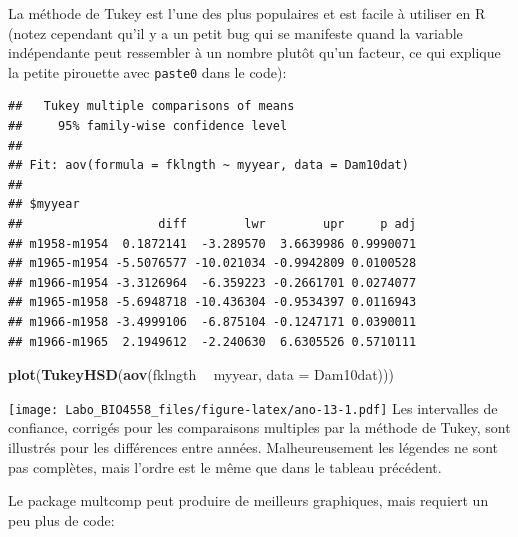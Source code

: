 \documentclass[12pt,]{book}
\newenvironment{Shaded}{\begin{snugshade}}{\end{snugshade}}
\newcommand{\DataTypeTok}[1]{\textcolor[rgb]{0.13,0.29,0.53}{#1}}
\newcommand{\KeywordTok}[1]{\textcolor[rgb]{0.13,0.29,0.53}{\textbf{#1}}}
\newcommand{\NormalTok}[1]{#1}
\newcommand{\OperatorTok}[1]{\textcolor[rgb]{0.81,0.36,0.00}{\textbf{#1}}}
\newcommand{\StringTok}[1]{\textcolor[rgb]{0.31,0.60,0.02}{#1}}
\begin{document}
La méthode de Tukey est l'une des plus populaires et est facile à utiliser en R (notez cependant qu'il y a un petit bug qui se manifeste quand la variable indépendante peut ressembler à un nombre plutôt qu'un facteur, ce qui explique la petite pirouette avec \texttt{paste0} dans le code):

\begin{Shaded}
\end{Shaded}

\begin{verbatim}
##   Tukey multiple comparisons of means
##     95% family-wise confidence level
## 
## Fit: aov(formula = fklngth ~ myyear, data = Dam10dat)
## 
## $myyear
##                   diff        lwr        upr     p adj
## m1958-m1954  0.1872141  -3.289570  3.6639986 0.9990071
## m1965-m1954 -5.5076577 -10.021034 -0.9942809 0.0100528
## m1966-m1954 -3.3126964  -6.359223 -0.2661701 0.0274077
## m1965-m1958 -5.6948718 -10.436304 -0.9534397 0.0116943
## m1966-m1958 -3.4999106  -6.875104 -0.1247171 0.0390011
## m1966-m1965  2.1949612  -2.240630  6.6305526 0.5710111
\end{verbatim}

\begin{Shaded}
\begin{Highlighting}[]
\KeywordTok{plot}\NormalTok{(}\KeywordTok{TukeyHSD}\NormalTok{(}\KeywordTok{aov}\NormalTok{(fklngth }\OperatorTok{~}\StringTok{ }\NormalTok{myyear, }\DataTypeTok{data =}\NormalTok{ Dam10dat)))}
\end{Highlighting}
\end{Shaded}

\texttt{[image: Labo\_BIO4558\_files/figure-latex/ano-13-1.pdf]}
Les intervalles de confiance, corrigés pour les comparaisons multiples par la méthode de Tukey, sont illustrés pour les différences entre années. Malheureusement les légendes ne sont pas complètes, mais l'ordre est le même que dans le tableau précédent.

Le package multcomp peut produire de meilleurs graphiques, mais requiert un peu plus de code:
\end{document}
